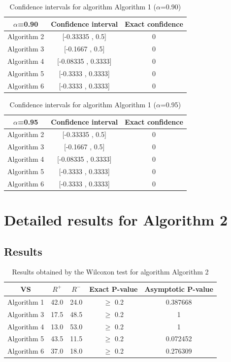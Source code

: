 \documentclass[a4paper,10pt]{article}
\begin{document}
\begin{table}[!htp]
\centering\small
\begin{tabular}{
|c|c|c|}
\hline
 $\alpha$=0.90 & Confidence interval & Exact confidence \\ \hline 
Algorithm 2 & [-0.33335 , 0.5] & 0\\ \hline 
Algorithm 3 & [-0.1667 , 0.5] & 0\\ \hline 
Algorithm 4 & [-0.08335 , 0.3333] & 0\\ \hline 
Algorithm 5 & [-0.3333 , 0.3333] & 0\\ \hline 
Algorithm 6 & [-0.3333 , 0.3333] & 0\\ \hline 

\end{tabular}
\caption{Confidence intervals for algorithm Algorithm 1 ($\alpha$=0.90)}
\end{table}
\begin{table}[!htp]
\centering\small
\begin{tabular}{
|c|c|c|}
\hline
 $\alpha$=0.95 & Confidence interval & Exact confidence \\ \hline 
Algorithm 2 & [-0.33335 , 0.5] & 0\\ \hline 
Algorithm 3 & [-0.1667 , 0.5] & 0\\ \hline 
Algorithm 4 & [-0.08335 , 0.3333] & 0\\ \hline 
Algorithm 5 & [-0.3333 , 0.3333] & 0\\ \hline 
Algorithm 6 & [-0.3333 , 0.3333] & 0\\ \hline 

\end{tabular}
\caption{Confidence intervals for algorithm Algorithm 1 ($\alpha$=0.95)}
\end{table}

 \clearpage 


\section{Detailed results for Algorithm 2}


\subsection{Results}

\begin{table}[!htp]
\centering\small
\begin{tabular}{
|c|c|c|c|c|}
\hline
 VS & $R^{+}$ & $R^{-}$ & Exact P-value & Asymptotic P-value \\ \hline 
Algorithm 1 & 42.0 & 24.0 & $\geq$ 0.2 & 0.387668\\ \hline 
Algorithm 3 & 17.5 & 48.5 & $\geq$ 0.2 & 1\\ \hline 
Algorithm 4 & 13.0 & 53.0 & $\geq$ 0.2 & 1\\ \hline 
Algorithm 5 & 43.5 & 11.5 & $\geq$ 0.2 & 0.072452\\ \hline 
Algorithm 6 & 37.0 & 18.0 & $\geq$ 0.2 & 0.276309\\ \hline 

\end{tabular}
\caption{Results obtained by the Wilcoxon test for algorithm Algorithm 2}
\end{table}
\end{document}
